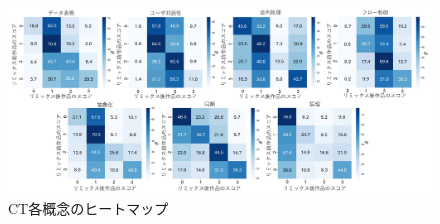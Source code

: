 \documentclass[submit,techrep,noauthor]{ipsj}
\begin{document}
\begin{figure}[t]
  \centering
  \includegraphics[width=\textwidth]{@IPSJ_SIGSE202511_Horio/fig/heatmapCTf.pdf}
  \caption{CT各概念のヒートマップ}
  \label{heatmap}
\end{figure}





\end{document}
